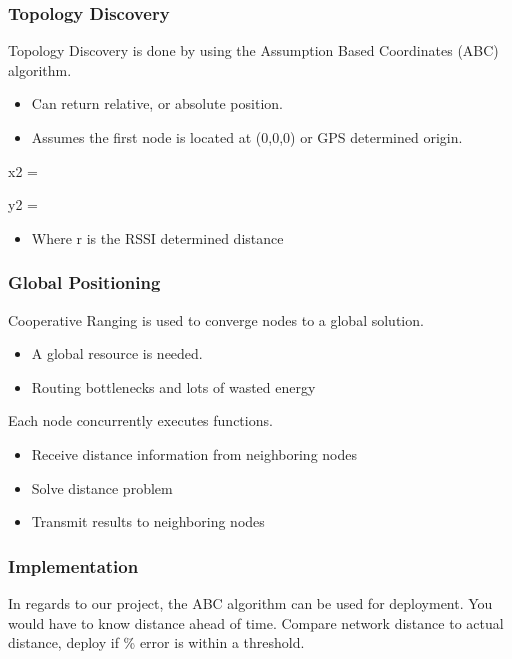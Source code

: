 \begin{frame}[t]
  \frametitle{Topology Discovery}

  Topology Discovery is done by using the Assumption Based Coordinates (ABC)
  algorithm.

  \begin{itemize}
  \item Can return relative, or absolute position.
  \item Assumes the first node is located at (0,0,0) or GPS determined origin.
  \end{itemize}
  
  \begin{center}
    x2 = 
  \end{center} \linebreak
  \begin{center}
    y2 = 
  \end{center}

  \vfill
  
  \begin{itemize}
  \item Where r is the RSSI determined distance
  \end{itemize}

  \vfill
\end {frame}

\begin{frame}[t]
  \frametitle{Global Positioning}

  Cooperative Ranging is used to converge nodes to a global solution.
  \begin{itemize}
  \item A global resource is needed.
  \item Routing bottlenecks and lots of wasted energy
  \end{itemize}

  Each node concurrently executes functions.
  \begin{itemize}
  \item Receive distance information from neighboring nodes
  \item Solve distance problem
  \item Transmit results to neighboring nodes
  \end{itemize}
\end{frame}

\begin{frame}[t]
  \frametitle{Implementation}

  \vfill 
  In regards to our project, the ABC algorithm can be used for deployment.
  \vfill
  You would have to know distance ahead of time.
  \vfill
  Compare network distance to actual distance, deploy if \% error is within a
  threshold.

  \vfill

\end {frame}

  

  
  
    

